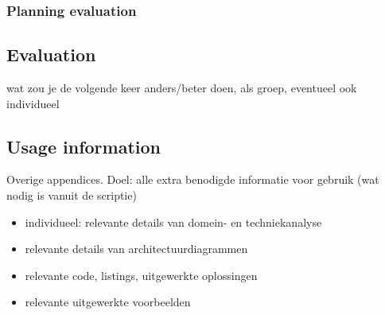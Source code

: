 \documentclass[a4paper,12pt,abstracton,titlepage]{scrartcl}
\begin{document}
\subsubsection{Planning evaluation}
\lipsum[1]

\subsection{Evaluation}
wat zou je de volgende keer anders/beter doen, als groep, eventueel ook individueel

\subsection{Usage information}
Overige appendices. Doel: alle extra benodigde informatie voor gebruik (wat nodig is vanuit de scriptie)

\begin{itemize}
\item individueel: relevante details van domein- en techniekanalyse
\item relevante details van architectuurdiagrammen
\item relevante code, listings, uitgewerkte oplossingen 
\item relevante uitgewerkte voorbeelden
\end{itemize}
\end{document}
